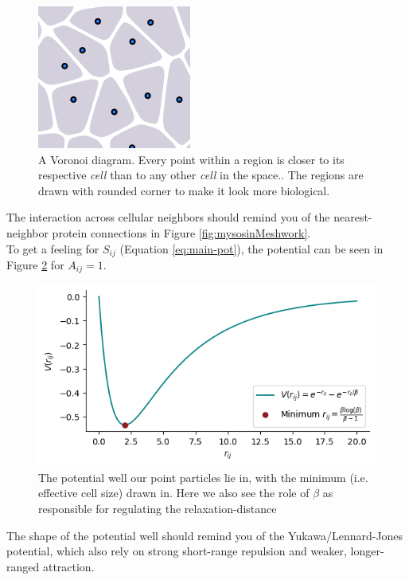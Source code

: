\begin{figure}
    \centering
    \includegraphics[width=0.25\linewidth]{chapters//Theory//figures/voronoi_explanation.png}
    \caption{A Voronoi diagram. Every point within a region is closer to its respective \textit{cell} than to any other \textit{cell} in the space.. The regions are drawn with rounded corner to make it look more biological.}
    \label{fig:voronoi-explanation}
\end{figure}
The interaction across cellular neighbors should remind you of the nearest-neighbor protein connections in Figure \ref{fig:mysosinMeshwork}. 
\\

To get a feeling for $S_{ij}$ (Equation \ref{eq:main-pot}), the potential can be seen in Figure \ref{fig:potential} for $A_{ij}=1$.
\begin{figure}[H]
    \centering
    \includegraphics[width=1.\linewidth]{chapters/Theory/figures/potential.png}
    \caption{The potential well our point particles lie in, with the minimum (i.e. effective cell size) drawn in. Here we also see the role of $\beta$ as responsible for regulating the relaxation-distance}
    \label{fig:potential}
\end{figure}

The shape of the potential well should remind you of the Yukawa/Lennard-Jones potential, which also rely on strong short-range repulsion and weaker, longer-ranged attraction.\\

